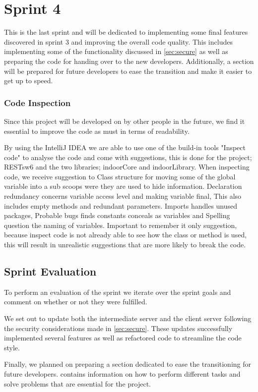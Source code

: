 \chapter{Sprint 4}
This is the last sprint and will be dedicated to implementing some final features discovered in sprint 3 and improving the overall code quality. This includes implementing some of the functionality discussed in \cref{sec:secure} as well as preparing the code for handing over to the new developers. Additionally, a section will be prepared for future developers to ease the transition and make it easier to get up to speed.

\subsection*{Code Inspection}
Since this project will be developed on by other people in the future, we find it essential to improve the code as must in terms of readability.

By using the IntelliJ IDEA we are able to use one of the build-in tools "Inspect code" to analyse the code and come with suggestions, this is done for the project; RESTsw6 and the two libraries; indoorCore and indoorLibrary. When inspecting code, we receive suggestion to Class structure for moving some of the global variable into a sub scoops were they are used to hide information. Declaration redundancy concerns variable access level and making variable final, This also includes empty methods and redundant parameters. Imports handles unused packages, Probable bugs finds constants conceals as variables and Spelling question the naming of variables. Important to remember it only suggestion, because inspect code is not already able to see how the class or method is used, this will result in unrealistic suggestions that are more likely to break the code.






\section{Sprint Evaluation}
To perform an evaluation of the sprint we iterate over the sprint goals and comment on whether or not they were fulfilled.

We set out to update both the intermediate server and the client server following the security considerations made in \cref{sec:secure}. These updates successfully implemented several features as well as refactored code to streamline the code style.

Finally, we planned on preparing a section dedicated to ease the transitioning for future developers.  contains information on how to perform different tasks and solve problems that are essential for the project.